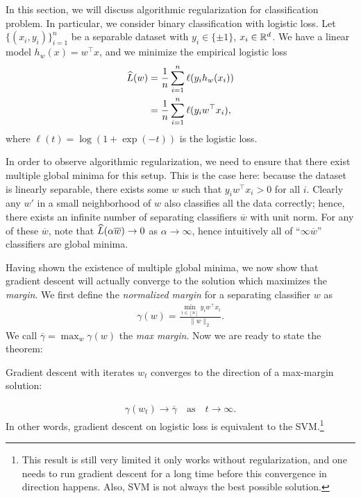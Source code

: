 


In this section, we will discuss algorithmic regularization for classification problem. In particular, we consider binary classification with logistic loss. Let $\{(x_i, y_i)\}_{i=1}^n$ be a separable dataset with $y_i\in \{\pm 1\}$, $x_i\in \mathbb R^d$. We have a linear model $h_w(x) = w^\top x$, and we minimize the empirical logistic loss 
\begin{align}
	\widehat{L} (w) &= \frac{1}{n} \sum_{i=1}^{n} \ell(y_i h_w(x_i))\\
	&= \frac{1}{n} \sum_{i=1}^{n} \ell(y_i w^\top x_i),
\end{align}
where $\ell(t) = \log(1+\exp(-t))$ is the logistic loss.

In order to observe algorithmic regularization, we need to ensure that there exist multiple global minima for this setup. This is the case here: because the dataset is linearly separable, there exists some $w$ such that $y_i w^\top x_i > 0$ for all $i$. Clearly any $w'$ in a small neighborhood of $w$ also classifies all the data correctly; hence, there exists an infinite number of separating classifiers $\overline{w}$ with unit norm. For any of these $\overline{w}$, note that $\widehat{L}(\alpha\overline{w}) \rightarrow 0$ as $\alpha \rightarrow \infty$, hence intuitively all of ``$\infty \overline{w}$'' classifiers are global minima.

Having shown the existence of multiple global minima, we now show that gradient descent will actually converge to the solution which maximizes the \textit{margin}. We first define the \textit{normalized margin} for a separating classifier $w$ as
\begin{align}
	\gamma(w) = \frac{\min_{i\in [n]} y_iw^\top x_i }{\|w\|_2}.
\end{align}
We call $\overline{\gamma} = \max_w \gamma(w)$ the \textit{max margin}. Now we are ready to state the theorem:

\begin{theorem}
	Gradient descent with iterates $w_t$ converges to the direction of a max-margin solution:
	
	\begin{align}
		\gamma(w_t) \rightarrow \overline{\gamma} \quad  \text{as} \quad t \rightarrow \infty.
	\end{align}
	In other words, gradient descent on logistic loss is equivalent to the SVM.\footnote{This result is still very limited it only works without regularization, and one needs to run gradient descent for a long time before this convergence in direction happens. Also, SVM is not always the best possible solution.}
\end{theorem}

